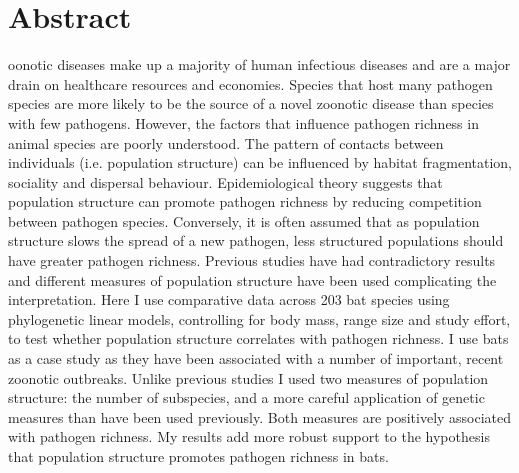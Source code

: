 





\section{Abstract}


oonotic diseases make up a majority of human infectious diseases and are a major drain on healthcare resources and economies.
Species that host many pathogen species are more likely to be the source of a novel zoonotic disease than species with few pathogens.
However, the factors that influence pathogen richness in animal species are poorly understood.
%
%
The pattern of contacts between individuals (i.e. population structure) can be influenced by habitat fragmentation, sociality and dispersal behaviour.
Epidemiological theory suggests that population structure can promote pathogen richness by reducing competition between pathogen species.
Conversely, it is often assumed that as population structure slows the spread of a new pathogen, less structured populations should have greater pathogen richness.
%
%
Previous studies have had contradictory results and different measures of population structure have been used complicating the interpretation.
%
%
Here I use comparative data across 203 bat species using phylogenetic linear models, controlling for body mass, range size and study effort, to test whether population structure correlates with pathogen richness.
I use bats as a case study as they have been associated with a number of important, recent zoonotic outbreaks.
Unlike previous studies I used two measures of population structure: the number of subspecies, and a more careful application of genetic measures than have been used previously.
Both measures are positively associated with pathogen richness.
%
%
My results add more robust support to the hypothesis that population structure promotes pathogen richness in bats.
